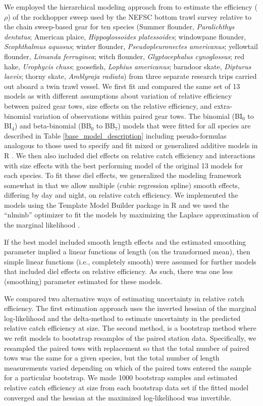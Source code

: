 \documentclass[
  12pt,
]{article}
\begin{document}
We employed the hierarchical modeling approach from \citet{miller13} to
estimate the efficiency (\(\rho\)) of the rockhopper sweep used by the
NEFSC bottom trawl survey relative to the chain sweep-based gear for ten
species (Summer flounder, \emph{Paralichthys dentatus}; American plaice,
\emph{Hippoglossoides platessoides}; windowpane flounder,
\emph{Scophthalmus aquosus}; winter flounder, \emph{Pseudopleuronectes
americanus}; yellowtail flounder, \emph{Limanda ferruginea}; witch
flounder, \emph{Glyptocephalus cynoglossus}; red hake, \emph{Urophycis
chuss}; goosefish, \emph{Lophius americanus}; barndoor skate,
\emph{Dipturus laevis}; thorny skate, \emph{Amblyraja radiata}) from
three separate research trips carried out aboard a twin trawl vessel. We
first fit and compared the same set of 13 models as \citet{miller13}
with different assumptions about variation of relative efficiency
between paired gear tows, size effects on the relative efficiency, and
extra-binomial variation of observations within paired gear tows. The
binomial (BI\(_0\) to BI\(_4\)) and beta-binomial (BB\(_0\) to BB\(_7\))
models that were fitted for all species are described in Table
\ref{base_model_description} including pseudo-formulas analogous to
those used to specify and fit mixed or generalized additive models in R
\citep{R19,wood06}. We then also included diel effects on relative catch
efficiency and interactions with size effects with the best performing
model of the original 13 models for each species. To fit these diel
effects, we generalized the modeling framework somewhat in that we allow
multiple (cubic regression spline) smooth effects, differing by day and
night, on relative catch efficiency. We implemented the models using the
Template Model Builder package \citep{kristensenetal16} in R and we used
the ``nlminb'' optimizer to fit the models by maximizing the Laplace
approximation of the marginal likelihood \citep{R19}.

If the best model included smooth length effects and the estimated
smoothing parameter implied a linear functions of length (on the
transformed mean), then simple linear functions (i.e., completely
smooth) were assumed for further models that included diel effects on
relative efficiency. As such, there was one less (smoothing) parameter
estimated for these models.

We compared two alternative ways of estimating uncertainty in relative
catch efficiency. The first estimation approach uses the inverted
hessian of the marginal log-likelihood and the delta-method to estimate
uncertainty in the predicted relative catch efficiency at size. The
second method, is a bootstrap method where we refit models to bootstrap
resamples of the paired station data. Specifically, we resampled the
paired tows with replacement so that the total number of paired tows was
the same for a given species, but the total number of length
measurements varied depending on which of the paired tows entered the
sample for a particular bootstrap. We made 1000 bootstrap samples and
estimated relative catch efficiency at size from each bootstrap data set
if the fitted model converged and the hessian at the maximized
log-likelihood was invertible.
\end{document}
